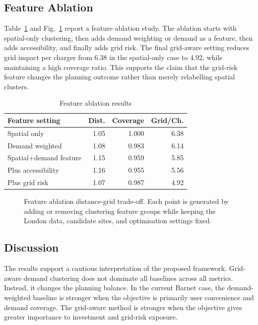 \subsection{Feature Ablation}
Table~\ref{tab:ablation} and Fig.~\ref{fig:ablation_tradeoff} report a feature ablation study. The ablation starts with spatial-only clustering, then adds demand weighting or demand as a feature, then adds accessibility, and finally adds grid risk. The final grid-aware setting reduces grid impact per charger from 6.38 in the spatial-only case to 4.92, while maintaining a high coverage ratio. This supports the claim that the grid-risk feature changes the planning outcome rather than merely relabelling spatial clusters.

\begin{table}[!t]
\centering
\caption{Feature ablation results}
\label{tab:ablation}
\begin{tabular}{lrrr}
\toprule
Feature setting & Dist. & Coverage & Grid/Ch. \\
\midrule
Spatial only & 1.05 & 1.000 & 6.38 \\
Demand weighted & 1.08 & 0.983 & 6.14 \\
Spatial+demand feature & 1.15 & 0.959 & 5.85 \\
Plus accessibility & 1.16 & 0.955 & 5.56 \\
Plus grid risk & 1.07 & 0.987 & 4.92 \\
\bottomrule
\end{tabular}
\end{table}

\begin{figure}[!t]
\centering

\caption{Feature ablation distance-grid trade-off. Each point is generated by adding or removing clustering feature groups while keeping the London data, candidate sites, and optimisation settings fixed.}
\label{fig:ablation_tradeoff}
\end{figure}

\subsection{Discussion}
The results support a cautious interpretation of the proposed framework. Grid-aware demand clustering does not dominate all baselines across all metrics. Instead, it changes the planning balance. In the current Barnet case, the demand-weighted baseline is stronger when the objective is primarily user convenience and demand coverage. The grid-aware method is stronger when the objective gives greater importance to investment and grid-risk exposure.

